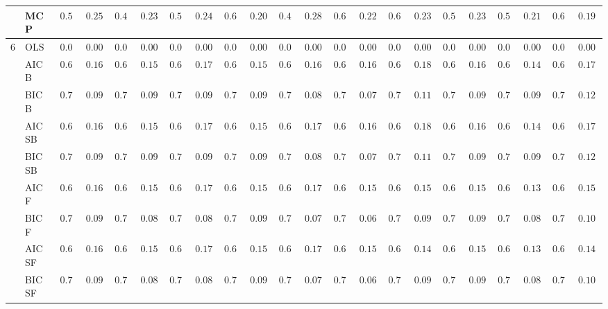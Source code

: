 \begin{tabular}{ll|ll|llllll|llllll|llllll}
 & MCP  & $0.542$ & $0.2531$ & $0.478$ & $0.2308$ & $0.564$ & $0.2402$ & $0.664$ & $0.2028$ & $0.496$ & $0.2835$ & $0.610$ & $0.2209$ & $0.636$ & $0.2351$ & $0.518$ & $0.2311$ & $0.552$ & $0.2110$ & $0.626$ & $0.1900$ \\\hline
6 & OLS  & $0.000$ & $0.0000$ & $0.000$ & $0.0000$ & $0.000$ & $0.0000$ & $0.000$ & $0.0000$ & $0.000$ & $0.0000$ & $0.000$ & $0.0000$ & $0.000$ & $0.0000$ & $0.000$ & $0.0000$ & $0.000$ & $0.0000$ & $0.000$ & $0.0000$ \\
 & AIC B  & $0.616$ & $0.1674$ & $0.620$ & $0.1595$ & $0.602$ & $0.1764$ & $0.634$ & $0.1584$ & $0.616$ & $0.1698$ & $0.616$ & $0.1600$ & $0.616$ & $0.1879$ & $0.604$ & $0.1608$ & $0.632$ & $0.1442$ & $0.602$ & $0.1717$ \\
 & BIC B  & $0.748$ & $0.0926$ & $0.748$ & $0.0926$ & $0.750$ & $0.0916$ & $0.734$ & $0.0987$ & $0.760$ & $0.0804$ & $0.766$ & $0.0755$ & $0.740$ & $0.1155$ & $0.744$ & $0.0988$ & $0.750$ & $0.0916$ & $0.724$ & $0.1296$ \\
 & AIC SB  & $0.616$ & $0.1674$ & $0.620$ & $0.1595$ & $0.602$ & $0.1764$ & $0.634$ & $0.1584$ & $0.612$ & $0.1701$ & $0.616$ & $0.1600$ & $0.616$ & $0.1879$ & $0.604$ & $0.1608$ & $0.632$ & $0.1442$ & $0.602$ & $0.1717$ \\
 & BIC SB  & $0.748$ & $0.0926$ & $0.748$ & $0.0926$ & $0.750$ & $0.0916$ & $0.734$ & $0.0987$ & $0.760$ & $0.0804$ & $0.766$ & $0.0755$ & $0.740$ & $0.1155$ & $0.744$ & $0.0988$ & $0.750$ & $0.0916$ & $0.724$ & $0.1296$ \\
 & AIC F  & $0.618$ & $0.1660$ & $0.624$ & $0.1538$ & $0.624$ & $0.1712$ & $0.654$ & $0.1500$ & $0.614$ & $0.1712$ & $0.642$ & $0.1565$ & $0.672$ & $0.1596$ & $0.612$ & $0.1578$ & $0.658$ & $0.1372$ & $0.648$ & $0.1507$ \\
 & BIC F  & $0.748$ & $0.0926$ & $0.752$ & $0.0858$ & $0.754$ & $0.0892$ & $0.740$ & $0.0921$ & $0.762$ & $0.0789$ & $0.772$ & $0.0697$ & $0.750$ & $0.0959$ & $0.746$ & $0.0979$ & $0.756$ & $0.0833$ & $0.736$ & $0.1097$ \\
 & AIC SF  & $0.618$ & $0.1660$ & $0.624$ & $0.1538$ & $0.624$ & $0.1712$ & $0.654$ & $0.1500$ & $0.614$ & $0.1712$ & $0.644$ & $0.1520$ & $0.680$ & $0.1477$ & $0.612$ & $0.1578$ & $0.658$ & $0.1372$ & $0.650$ & $0.1460$ \\
 & BIC SF  & $0.748$ & $0.0926$ & $0.752$ & $0.0858$ & $0.754$ & $0.0892$ & $0.740$ & $0.0921$ & $0.762$ & $0.0789$ & $0.772$ & $0.0697$ & $0.750$ & $0.0959$ & $0.746$ & $0.0979$ & $0.756$ & $0.0833$ & $0.736$ & $0.1097$ \\

\end{tabular}
